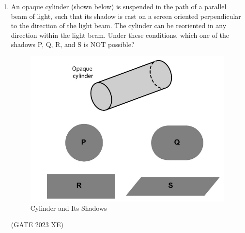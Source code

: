\documentclass[journal,12pt,onecolumn]{IEEEtran}
\begin{document}
\begin{enumerate}
\begin{figure}[htbp]
\caption{(Graphs)}

\label{fig:figs/GA/fig2.png}

\end{figure}

\hfill{(GATE 2023 XE)}

\begin{multicols}{4}

\begin{enumerate}

\item P

\item Q

\item R

\item S

\end{enumerate}

\end{multicols}


\newpage

\item An opaque cylinder (shown below) is suspended in the path of a parallel beam of 
light, such that its shadow is cast on a screen oriented perpendicular to the 
direction of the light beam. The cylinder can be reoriented in any direction within 
the light beam. Under these conditions, which one of the shadows P, Q, R, and S 
is NOT possible?

\begin{figure}[htbp]

\centering

\includegraphics[width=.5\columnwidth]{figs/GA/fig3.png}

\caption{Cylinder and Its Shadows}

\label{fig:figs/GA/fig3.png}

\end{figure}

\hfill{(GATE 2023 XE)}

\begin{multicols}{4}


\end{multicols}
\end{enumerate}
\end{document}

